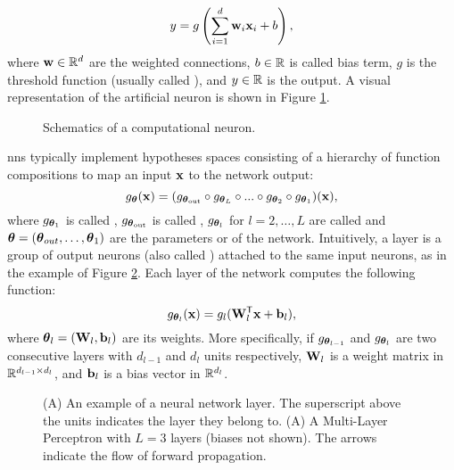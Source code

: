 $$y = g\Paren{\sum_{i=1}^d \Vector{w}_{i}\Vector{x}_i + b},$$
where $\Vector{w} \in \Real^d$ are the weighted connections, $b \in \mathbb{R}$ is called bias term, $g$ is the threshold function (usually called ), and $y \in \mathbb{R}$ is the output. A visual representation of the artificial neuron is shown in Figure \ref{fig:neuron}.
\begin{figure}[t!]
    \centering
    \resizebox{.4\textwidth}{!}{}
    \caption{Schematics of a computational neuron.}
    \label{fig:neuron}
\end{figure}
\glspl{nn} typically implement hypotheses spaces consisting of a hierarchy of function compositions to map an input $\Vector{x}$ to the network output:
$$g_{\Param}(\Vector{x}) = (g_{\Param_\mathrm{out}} \circ g_{\Param_L} \circ ... \circ g_{\Param_{\mathrm{2}}} \circ g_{\Param_{\mathrm{1}}})(\Vector{x}),$$
where $g_{\boldsymbol{\theta}_{\mathrm{1}}}$ is called , $g_{\boldsymbol{\theta}_\mathrm{out}}$ is called , $g_{\boldsymbol{\theta}_l}$ for $l = 2, \ldots, L$ are called  and $\boldsymbol{\theta} = (\boldsymbol{\theta}_{out}, \ldots, \boldsymbol{\theta}_{1})$ are the parameters or  of the network. Intuitively, a layer is a group of output neurons (also called ) attached to the same input neurons, as in the example of Figure \ref{fig:layer}. Each layer of the network computes the following function:
$$ g_{\Param_{l}}(\Vector{x}) = g_l(\Matrix{W}_l^{\Transpose}\Vector{x} + \Vector{b}_l),$$
where $\Param_l = (\Matrix{W}_l, \Vector{b}_l)$ are its weights. More specifically, if $g_{\boldsymbol{\theta}_{l-1}}$ and $g_{\boldsymbol{\theta}_{l}}$ are two consecutive layers with $d_{l-1}$ and $d_{l}$ units respectively,  $\Matrix{W}_{l}$ is a weight matrix in $\mathbb{R}^{d_{l-1} \times d_{l}}$, and $\Vector{b}_{l}$ is a bias vector in $\mathbb{R}^{d_l}$.
\begin{figure*}[h!]
    \begin{subfigure}[b]{0.45\linewidth}
        \centering
        \resizebox{.8\textwidth}{!}{}
        \caption{}
        \label{fig:layer}
    \end{subfigure}
    \begin{subfigure}[b]{0.45\linewidth}
        \centering
        \resizebox{.8\textwidth}{!}{}
        \caption{}
        \label{fig:network}
    \end{subfigure}
    \caption{({\scriptsize A}) An example of a neural network layer. The superscript above the units indicates the layer they belong to. ({\scriptsize A}) A Multi-Layer Perceptron
    with $L=3$ layers (biases not shown). The arrows indicate the flow of forward propagation.}
\end{figure*}
